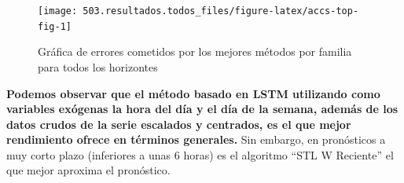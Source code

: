 \documentclass[]{book}
\begin{document}
\begin{table}[t]

\caption{\label{tab:accs-top-tab}RMSE y MAPE para el mejor método de cada familia con horizonte de pronóstico a 1, 4, 12, 24 y 48 horas}
\centering
{}
\end{table}

\begin{figure}[H]

{\centering \texttt{[image: 503.resultados.todos\_files/figure-latex/accs-top-fig-1]} 

}

\caption{Gráfica de errores cometidos por los mejores métodos por familia para todos los horizontes}\label{fig:accs-top-fig}
\end{figure}

\textbf{Podemos observar que el método basado en LSTM utilizando como
variables exógenas la hora del día y el día de la semana, además de los
datos crudos de la serie escalados y centrados, es el que mejor
rendimiento ofrece en términos generales.} Sin embargo, en pronósticos a
muy corto plazo (inferiores a unas 6 horas) es el algoritmo ``STL W
Reciente'' el que mejor aproxima el pronóstico.
\end{document}

